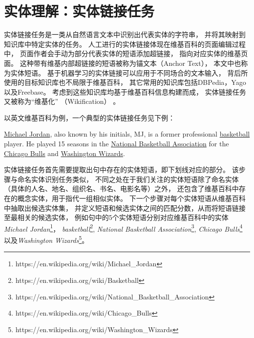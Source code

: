 
\section{实体理解：实体链接任务}
\label{sec:rw-linking}


实体链接任务是一类从自然语言文本中识别出代表实体的字符串，
并将其映射到知识库中特定实体的任务。
人工进行的实体链接体现在维基百科的页面编辑过程中，
页面作者会手动为部分代表实体的短语添加超链接，
指向对应实体的维基页面。
这种带有维基内部超链接的短语被称为锚文本（Anchor Text），
本文中也称为实体短语。
基于机器学习的实体链接可以应用于不同场合的文本输入，
背后所使用的目标知识库也不局限于维基百科，
其它常用的知识库包括DBPedia，Yago以及Freebase。
考虑到这些知识库均基于维基百科信息构建而成，
实体链接任务又被称为``{维基化}'' （Wikification）
\cite{mihalcea2007wikify}。

以英文维基百科为例，一个典型的实体链接任务见下例：

\vspace{0.2cm}
\underline{Michael Jordan}, also known by his initials, MJ, 
is a former professional \underline{basketball}
player. He played 15 seasons in the 
\underline{National Basketball Association} for 
the \underline{Chicago Bulls}
and \underline{Washington Wizards}.
\vspace{0.2cm}

实体链接任务首先需要提取出句中存在的实体短语，即下划线对应的部分。
该步骤与命名实体识别任务类似，
不同之处在于我们关注的实体短语除了命名实体
（具体的人名、地名、组织名、书名、电影名等）之外，
还包含了维基百科中存在的概念实体，用于指代一组相似实体。%
下一个步骤对每个实体短语从维基百科中抽取出候选实体集，
并定义短语和候选实体之间的匹配分数，从而将短语链接至最相关的候选实体，
例如句中的5个实体短语分别对应维基百科中的实体
\textit{Michael Jordan}\footnote{https://en.wikipedia.org/wiki/Michael\_Jordan}，
\textit{basketball}\footnote{https://en.wikipedia.org/wiki/Basketball},
\textit{National Basketball Association}\footnote{https://en.wikipedia.org/wiki/National\_Basketball\_Association},
\textit{Chicago Bulls}\footnote{https://en.wikipedia.org/wiki/Chicago\_Bulls}
以及\textit{Washington Wizards}\footnote{https://en.wikipedia.org/wiki/Washington\_Wizards}。

